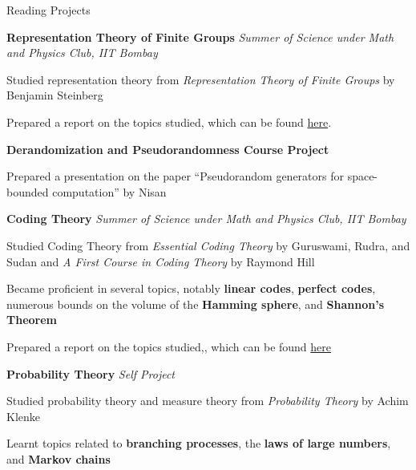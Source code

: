 \begin{rubric}{Reading Projects}

	\entry*[2022] \textbf{Representation Theory of Finite Groups} \hfill \emph{Summer of Science under Math and Physics Club, IIT Bombay}

		Studied representation theory from \emph{Representation Theory of Finite Groups} by Benjamin Steinberg

		Prepared a report on the topics studied, which can be found \href{https://amitrajaraman.github.io/notes/rep-th/main.pdf}{here}.

	\entry*[2022\phantom{}] \textbf{Derandomization and Pseudorandomness Course Project}

		Prepared a presentation on the paper ``Pseudorandom generators for space-bounded computation'' by Nisan



	\entry*[2020] \textbf{Coding Theory} \hfill \emph{Summer of Science under Math and Physics Club, IIT Bombay}

		Studied Coding Theory from \textit{Essential Coding Theory} by Guruswami, Rudra, and Sudan and \textit{A First Course in Coding Theory} by Raymond Hill
		
		Became proficient in several topics, notably \textbf{linear codes}, \textbf{perfect codes}, numerous bounds on the volume of the \textbf{Hamming sphere}, and \textbf{Shannon's Theorem}

		Prepared a report on the topics studied,, which can be found \href{https://amitrajaraman.github.io/notes/coding-th/Coding_Theory.pdf}{here}

	\entry*[2020\phantom{}] \textbf{Probability Theory} \hfill \textit{Self Project}

		Studied probability theory and measure theory from \textit{Probability Theory} by Achim Klenke

		Learnt topics related to \textbf{branching processes}, the \textbf{laws of large numbers}, and \textbf{Markov chains}


        
\end{rubric}